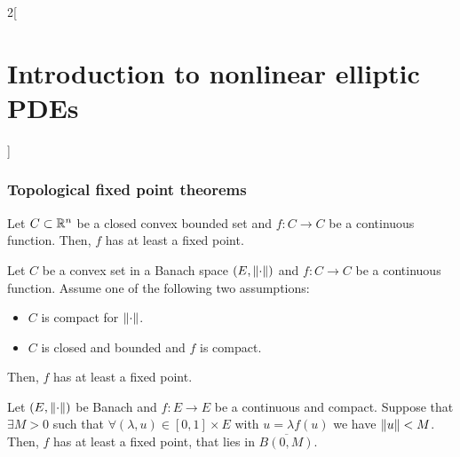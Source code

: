 \documentclass[../../../main_math.tex]{subfiles}
\begin{document}
\begin{multicols}{2}[\section{Introduction to nonlinear elliptic PDEs}]
  \subsubsection{Topological fixed point theorems}
  \begin{theorem}
    Let $C\subset \mathbb{R}^n$ be a closed convex bounded set and $f:C\to C$ be a continuous function. Then, $f$ has at least a fixed point.
  \end{theorem}
  \begin{theorem}
    Let $C$ be a convex set in a Banach space $(E,\left\|\cdot\right\|)$ and $f:C\to C$ be a continuous function. Assume one of the following two assumptions:
    \begin{itemize}
      \item $C$ is compact for $\left\|\cdot\right\|$.
      \item $C$ is closed and bounded and $f$ is compact.
    \end{itemize}
    Then, $f$ has at least a fixed point.
  \end{theorem}
  \begin{theorem}
    Let $(E, \left\|\cdot\right\|)$ be Banach and $f:E\to E$ be a continuous and compact. Suppose that $\exists M>0$ such that $\forall (\lambda,u)\in [0,1]\times E$ with $u=\lambda f(u)$ we have $\left\|u\right\|<M$. Then, $f$ has at least a fixed point, that lies in $\overline{B(0,M)}$.
  \end{theorem}
\end{multicols}
\end{document}
